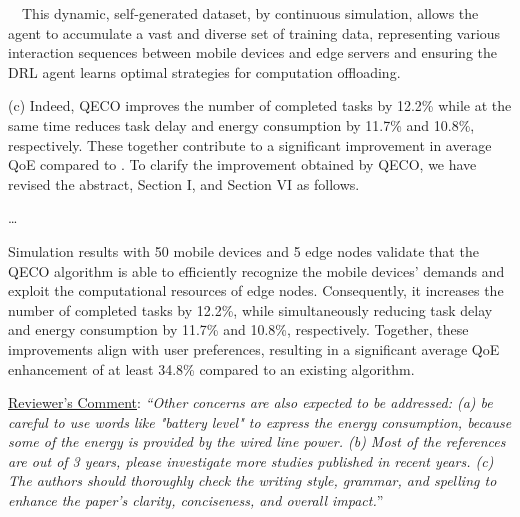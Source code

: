 \documentclass[12pt,draftclsnofoot,onecolumn]{IEEEtran}
\newcommand{\rev}[1]{{\color{blue}#1}} %
\newcommand{\rev}[1]{#1}
\newenvironment{my}[2]%
{\begin{list}{}%
{\setlength{\rightmargin}{#1}\setlength{\leftmargin}{#2}}%


 \item[]{}

} {\end{list}}
\begin{document}
\begin{enumerate}
\,\,\,\, This dynamic, self-generated dataset, by continuous simulation, allows the agent to accumulate a vast and diverse set of training data, representing various interaction sequences between mobile devices and edge servers and ensuring the DRL agent learns optimal strategies for computation offloading.




\vspace{6mm}

(c) Indeed, QECO improves the number of completed tasks by 12.2\% while at the same time reduces task delay and energy consumption by 11.7\% and 10.8\%, respectively. These together contribute to a significant improvement  in average QoE compared to \cite{qiu2020distributed}. To clarify the improvement obtained by QECO, we have revised the abstract, Section I, and Section VI as follows.




		\begin{my}{1cm}{1cm}
	\rev{
	
				\dots 
				
				Simulation results with 50 mobile devices and 5 edge nodes validate that the QECO algorithm is able to efficiently recognize the mobile devices' demands and exploit the computational resources of edge nodes. 
				Consequently, it increases the number of completed tasks by 12.2\%, while simultaneously reducing task delay and energy consumption by 11.7\% and 10.8\%, respectively. Together, these improvements align with user preferences, resulting in a significant average QoE enhancement of at least 34.8\% compared to an existing algorithm.
}
	
\end{my}

\vspace{5mm}

\item \underline{Reviewer's Comment}: 
\textit{``Other concerns are also expected to be addressed: (a) be careful to use words like "battery level" to express the energy consumption, because some of the energy is provided by the wired line power. (b) Most of the references are out of 3 years, please investigate more studies published in recent years. (c) The authors should thoroughly check the writing style, grammar, and spelling to enhance the paper's clarity, conciseness, and overall impact.}''\newline


\end{enumerate}
\end{document}
